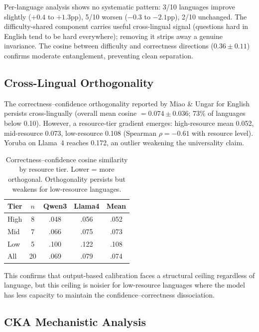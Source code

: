 \documentclass[11pt,a4paper]{article}
\begin{document}
Per-language analysis shows no systematic pattern: 3/10 languages improve slightly ($+0.4$ to $+1.3$pp), 5/10 worsen ($-0.3$ to $-2.1$pp), 2/10 unchanged. The difficulty-shared component carries useful cross-lingual signal (questions hard in English tend to be hard everywhere); removing it strips away a genuine invariance. The cosine between difficulty and correctness directions ($0.36 \pm 0.11$) confirms moderate entanglement, preventing clean separation.

\subsection{Cross-Lingual Orthogonality}
\label{sec:orthogonality}

The correctness--confidence orthogonality reported by Miao \& Ungar \cite{miao2026orthogonality} for English persists cross-lingually (overall mean cosine $= 0.074 \pm 0.036$; 73\% of languages below 0.10). However, a resource-tier gradient emerges: high-resource mean 0.052, mid-resource 0.073, low-resource 0.108 (Spearman $\rho = -0.61$ with resource level). Yoruba on Llama~4 reaches 0.172, an outlier weakening the universality claim.

\begin{table}[t]
\centering
\small
\begin{tabular}{@{}lcccc@{}}
\toprule
\textbf{Tier} & \textbf{$n$} & \textbf{Qwen3} & \textbf{Llama4} & \textbf{Mean} \\
\midrule
High & 8 & .048 & .056 & .052 \\
Mid & 7 & .066 & .075 & .073 \\
Low & 5 & .100 & .122 & .108 \\
All & 20 & .069 & .079 & .074 \\
\bottomrule
\end{tabular}
\caption{Correctness--confidence cosine similarity by resource tier. Lower = more orthogonal. Orthogonality persists but weakens for low-resource languages.}
\label{tab:orthogonality}
\end{table}

This confirms that output-based calibration faces a structural ceiling regardless of language, but this ceiling is noisier for low-resource languages where the model has less capacity to maintain the confidence--correctness dissociation.

\subsection{CKA Mechanistic Analysis}
\label{sec:cka}
\end{document}
